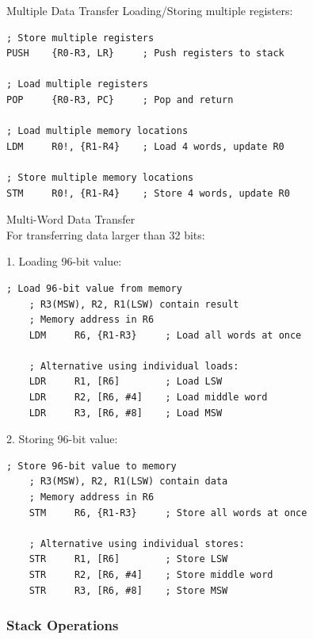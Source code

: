 \begin{example2}{Multiple Data Transfer}
Loading/Storing multiple registers:
\begin{lstlisting}[language=armasm, style=basesmol]
; Store multiple registers
PUSH    {R0-R3, LR}     ; Push registers to stack

; Load multiple registers
POP     {R0-R3, PC}     ; Pop and return

; Load multiple memory locations
LDM     R0!, {R1-R4}    ; Load 4 words, update R0

; Store multiple memory locations
STM     R0!, {R1-R4}    ; Store 4 words, update R0
\end{lstlisting}
\end{example2}

\begin{KR}{Multi-Word Data Transfer}\\
For transferring data larger than 32 bits:

1. Loading 96-bit value:
\begin{lstlisting}[language=armasm, style=basesmol]
    ; Load 96-bit value from memory
    ; R3(MSW), R2, R1(LSW) contain result
    ; Memory address in R6
    LDM     R6, {R1-R3}     ; Load all words at once
    
    ; Alternative using individual loads:
    LDR     R1, [R6]        ; Load LSW
    LDR     R2, [R6, #4]    ; Load middle word
    LDR     R3, [R6, #8]    ; Load MSW
\end{lstlisting}

2. Storing 96-bit value:
\begin{lstlisting}[language=armasm, style=basesmol]
    ; Store 96-bit value to memory
    ; R3(MSW), R2, R1(LSW) contain data
    ; Memory address in R6
    STM     R6, {R1-R3}     ; Store all words at once
    
    ; Alternative using individual stores:
    STR     R1, [R6]        ; Store LSW
    STR     R2, [R6, #4]    ; Store middle word
    STR     R3, [R6, #8]    ; Store MSW
\end{lstlisting}
\end{KR}

\subsubsection{Stack Operations}

